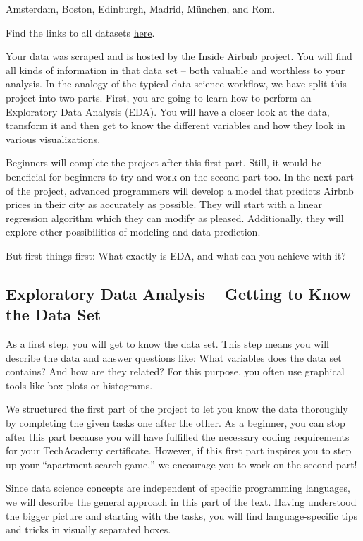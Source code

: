 \documentclass[
  11pt,
]{article}
\begin{document}
Amsterdam, Boston, Edinburgh, Madrid, München, and Rom.

Find the links to all datasets \href{https://docs.google.com/document/d/1nBkeJmpnoiATVw4B3DwrB45uo0TpQFE_iTisyh4p9Ro/edit?usp=sharing}{here}.

Your data was scraped and is hosted by the Inside Airbnb project.
You will find all kinds of information in that data set -- both valuable and worthless to your analysis.
In the analogy of the typical data science workflow, we have split this project into two parts.
First, you are going to learn how to perform an Exploratory Data Analysis (EDA).
You will have a closer look at the data, transform it and then get to know the different variables and how they look in various visualizations.

Beginners will complete the project after this first part.
Still, it would be beneficial for beginners to try and work on the second part too.
In the next part of the project, advanced programmers will develop a model that predicts Airbnb prices in their city as accurately as possible.
They will start with a linear regression algorithm which they can modify as pleased.
Additionally, they will explore other possibilities of modeling and data prediction.

But first things first: What exactly is EDA, and what can you achieve with it?

\hypertarget{exploratory-data-analysis-getting-to-know-the-data-set}{%
\subsection{Exploratory Data Analysis -- Getting to Know the Data Set}\label{exploratory-data-analysis-getting-to-know-the-data-set}}

As a first step, you will get to know the data set.
This step means you will describe the data and answer questions like: What variables does the data set contains?
And how are they related?
For this purpose, you often use graphical tools like box plots or histograms.

We structured the first part of the project to let you know the data thoroughly by completing the given tasks one after the other.
As a beginner, you can stop after this part because you will have fulfilled the necessary coding requirements for your TechAcademy certificate.
However, if this first part inspires you to step up your ``apartment-search game,'' we encourage you to work on the second part!

Since data science concepts are independent of specific programming languages, we will describe the general approach in this part of the text.
Having understood the bigger picture and starting with the tasks, you will find language-specific tips and tricks in visually separated boxes.
\end{document}
